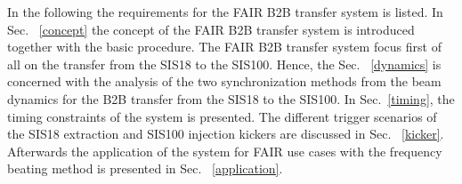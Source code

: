 In the following the requirements for the FAIR B2B transfer system is listed. In Sec. ~\ref{concept} the concept of the FAIR B2B transfer system is introduced together with the basic procedure. The FAIR B2B transfer system focus first of all on the transfer from the SIS18 to the SIS100. Hence, the Sec. ~\ref{dynamics} is concerned with the analysis of the two synchronization methods from the beam dynamics for the B2B transfer from the SIS18 to the SIS100. In Sec.~\ref{timing}, the timing constraints of the system is presented. The different trigger scenarios of the SIS18 extraction and SIS100 injection kickers are discussed in Sec. ~\ref{kicker}. Afterwards the application of the system for FAIR use cases with the frequency beating method is presented in Sec. ~\ref{application}.


